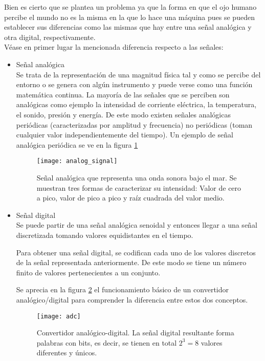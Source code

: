 Bien es cierto que se plantea un problema ya que la forma en que el ojo humano percibe el mundo no es la misma en la que lo hace una máquina pues se pueden establecer sus diferencias como las mismas que hay entre una señal analógica y otra digital, respectivamente.
\\
Véase en primer lugar la mencionada diferencia respecto a las señales:

\begin{itemize}
\item Señal analógica
\\
Se trata de la representación de una magnitud física tal y como se percibe del entorno o se genera con algún instrumento y puede verse como una función matemática continua.
La mayoría de las señales que se perciben son analógicas como ejemplo la intensidad de corriente eléctrica, la temperatura, el sonido, presión y energía.
De este modo existen señales analógicas periódicas (caracterizadas por amplitud y frecuencia) no periódicas (toman cualquier valor independientemente del tiempo). Un ejemplo de señal analógica periódica se ve en la figura \ref{fig:analog_signal}

\begin{figure}[!htb]
\centering
{}
  \texttt{[image: analog\_signal]}
  \caption{Señal analógica que representa una onda sonora bajo el mar. Se muestran tres formas de caracterizar su intensidad: Valor de cero a pico, valor de pico a pico y raíz cuadrada del valor medio.}\label{fig:analog_signal}
  
\endminipage\hfill
\end{figure}

\item Señal digital
\\
Se puede partir de una señal analógica senoidal y entonces llegar a una señal discretizada tomando valores equidistantes en el tiempo.

Para obtener una señal digital, se codifican cada uno de los valores discretos de la señal representada anteriormente. De este modo se tiene un número finito de valores pertenecientes a un conjunto.

Se aprecia en la figura \ref{fig:adc} el funcionamiento básico de un convertidor analógico/digital para comprender la diferencia entre estos dos conceptos.

\begin{figure}[!htb]
\centering
{}
  \texttt{[image: adc]}
  \caption{Convertidor analógico-digital. La señal digital resultante forma palabras con  bits, es decir, se tienen en total $2^3=8$  valores diferentes y únicos.}\label{fig:adc}
\endminipage\hfill
\end{figure}


\end{itemize}

